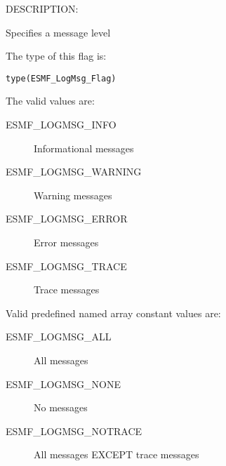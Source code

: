 {\sf DESCRIPTION:\\}
\begin{sloppypar}
Specifies a message level
\end{sloppypar}

The type of this flag is:

{\tt type(ESMF\_LogMsg\_Flag)}

The valid values are:
\begin{description}
   \item [ESMF\_LOGMSG\_INFO] 
         Informational messages
   \item [ESMF\_LOGMSG\_WARNING]
         Warning messages
   \item [ESMF\_LOGMSG\_ERROR]
         Error messages
   \item [ESMF\_LOGMSG\_TRACE]
         Trace messages
\end{description}

Valid predefined named array constant values are:

\begin{description}
	\item [ESMF\_LOGMSG\_ALL]
		All messages
	\item [ESMF\_LOGMSG\_NONE]
		No messages
	\item [ESMF\_LOGMSG\_NOTRACE]
		All messages EXCEPT trace messages
\end{description}



